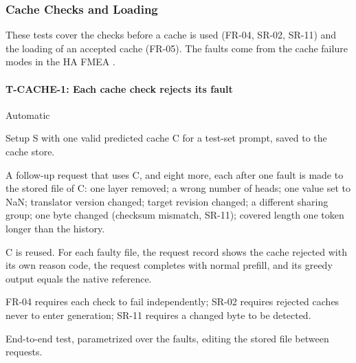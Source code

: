 \documentclass[12pt, titlepage]{article}
\newenvironment{testcase}[2]
  {\Needspace{8\baselineskip}\paragraph{#1: #2}\phantomsection\label{test:#1}\sloppy
   \begin{description}[style=sameline, leftmargin=3.6cm, labelwidth=3.4cm,
     font=\normalfont\bfseries, itemsep=2pt, topsep=2pt]}
  {\end{description}}
\begin{document}
\subsubsection{Cache Checks and Loading}

These tests cover the checks before a cache is used (FR-04, SR-02, SR-11)
and the loading of an accepted cache (FR-05). The faults come from the
cache failure modes in the HA FMEA \citep[Section~6]{TandemHA}.

\begin{testcase}{T-CACHE-1}{Each cache check rejects its fault}
\item[Control] Automatic
\item[Initial state] Setup S with one valid predicted cache C for a
test-set prompt, saved to the cache store.
\item[Input] A follow-up request that uses C, and eight more, each after
one fault is made to the stored file of C: one layer removed; a wrong
number of heads; one value set to NaN; translator version changed; target
revision changed; a different sharing group; one byte changed (checksum
mismatch, SR-11); covered length one token longer than the history.
\item[Output] C is reused. For each faulty file, the request record shows
the cache rejected with its own reason code, the request completes with
normal prefill, and its greedy output equals the native reference.
\item[Derivation] FR-04 requires each check to fail independently; SR-02
requires rejected caches never to enter generation; SR-11 requires a
changed byte to be detected.
\item[How performed] End-to-end test, parametrized over the faults, editing
the stored file between requests.
\end{testcase}
\end{document}

